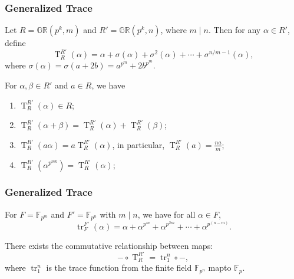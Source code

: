 \documentclass[
    aspectratio=169,                   %
]{beamer}
\renewcommand{\Bbb}{\mathbb}
\newcommand{\GR}{\mathbb{GR}}
\newcommand{\F}{\mathbb{F}}
\newcommand{\tr}{\operatorname{tr}}
\newcommand{\gtr}{\operatorname{T}}
\begin{document}
\begin{frame}
    \frametitle{Generalized Trace}
  
    Let $ R=\GR(p^k,m) $ and $ R'=\GR(p^k,n) $, where $ m\mid n $. Then for any $ \alpha\in R' $, define 
    \[\gtr_R^{R'}(\alpha)=\alpha+\sigma(\alpha)+\sigma^2(\alpha)+\cdots+\sigma^{n/m-1}(\alpha),\]
    where $ \sigma(\alpha)=\sigma(a+2b)=a^{p^m}+2b^{p^m} $.
    \begin{theorem}
        For $ \alpha,\beta\in R' $ and $ a\in R $, we have 
        \begin{enumerate} 
            \item $ \gtr_R^{R'}(\alpha)\in R $;
            \item $ \gtr_R^{R'}(\alpha+\beta)=\gtr_R^{R'}(\alpha)+\gtr_R^{R'}(\beta) $;
            \item $ \gtr_R^{R'}(a\alpha)=a\gtr_R^{R'}(\alpha) $, in particular, $ \gtr_R^{R'}(a)=\frac{na}{m} $;
            \item $ \gtr_R^{R'}(\alpha^{p^{mk}})=\gtr_R^{R'}(\alpha) $;
        \end{enumerate}
    \end{theorem}
    
\end{frame}
\begin{frame}
    \frametitle{Generalized Trace}
    \begin{remark}
        For $ F=\F_{p^m} $ and  $ F'=\F_{p^n} $ with $ m\mid n $, we have for all $ \alpha\in F $, 
        \[\tr_F^{F'}(\alpha)=\alpha+\alpha^{p^{m}}+\alpha^{p^{2m}}+\cdots+\alpha^{p^{(n-m)}}.\]
    \end{remark}

    There exists the commutative relationship between maps:
    \[-\circ \gtr_R^{R'}=\tr_1^n\circ-,\]
    where $ \tr_1^n $ is the trace function from the finite field $ \Bbb F_{p^n} $ mapto $ \Bbb F_p $. 
    
\end{frame}
\end{document}
